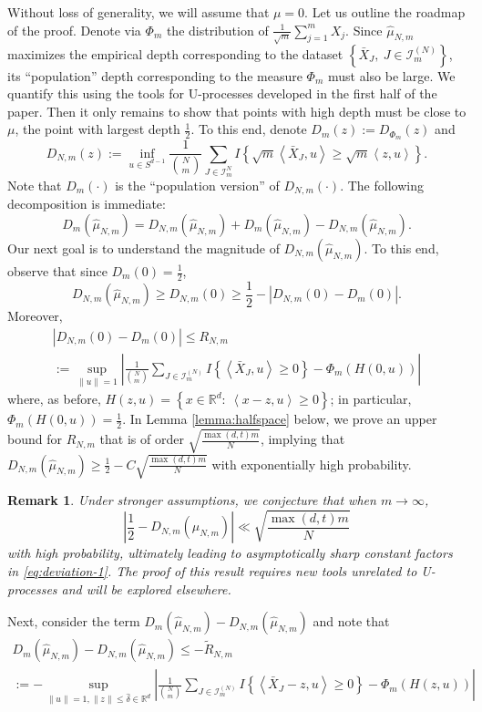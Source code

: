 \documentclass[12pt]{article}
\newcommand{\wh}{\widehat}
\newcommand{\be}[1]{\begin{equation*}#1\end{equation*}}
\def\l{\left}
\def\r{\right}
\newcommand{\m}{\mathcal}
\newcommand{\mb}{\mathbb}
\newcommand{\dotp}[2]{\left\langle#1,#2\right\rangle}
\theoremstyle{thmstyletwo}%
\newtheorem{remark}{Remark}%
\theoremstyle{thmstylethree}%
\begin{document}
Without loss of generality, we will assume that $\mu = 0$. 
Let us outline the roadmap of the proof. Denote via $\Phi_m$ the distribution of $\frac{1}{\sqrt{m}}\sum_{j=1}^m X_j$. Since $\wh\mu_{N,m}$ maximizes the empirical depth corresponding to the dataset $\l\{ \bar X_J, \ J\in \m I_{m}^{(N)}\r\}$, its ``population'' depth corresponding to the measure $\Phi_m$ must also be large. We quantify this using the tools for U-processes developed in the first half of the paper. Then it only remains to show that points with high depth must be close to $\mu$, the point with largest depth $\frac12$. To this end, denote $D_m(z):=D_{\Phi_m}(z)$ and
\[
 D_{N,m}(z):= \inf_{u\in S^{d-1}} \frac{1}{{N \choose m}} \sum_{J \in \mathcal{I}^N_m} I\left\{ \sqrt{m}\dotp{\bar X_J}{u}\geq \sqrt{m}\dotp{z}{u}\right\}.
\]
Note that $D_m(\cdot)$ is the ``population version'' of $D_{N,m}(\cdot)$. The following decomposition is immediate: 
\be{
D_m(\wh\mu_{N,m}) =  D_{N,m}(\wh\mu_{N,m}) + D_m(\wh\mu_{N,m}) -  D_{N,m}(\wh\mu_{N,m}).
}
Our next goal is to understand the magnitude of $D_{N,m}(\wh\mu_{N,m})$. To this end, observe that since $D_m(0)=\frac12$,
\[
 D_{N,m}(\wh\mu_{N,m})\geq  D_{N,m}(0) \geq \frac12 - \l| D_{N,m}(0)-D_m(0)\r|.
\]
Moreover, 
\begin{multline*}
\l| D_{N,m}(0)-D_m(0)\r| \leq R_{N,m}
\\
:= \sup_{\|u\|=1} \l| \frac{1}{{N\choose m}} \sum_{J\in \m I_{m}^{(N)} }I\left\{ \dotp{\bar X_J}{u}\geq 0\right\} - \Phi_m\l( H(0,u) \r)\r|
\end{multline*}
where, as before, $H(z,u)= \l\{ x\in\mb R^d: \ \dotp{x-z}{u}\geq 0\r\}$; in particular, $\Phi_m\l( H(0,u) \r) = \frac12$. In Lemma \ref{lemma:halfspace} below, we prove an upper bound for $R_{N,m}$ that is of order $\sqrt{\frac{\max(d,t)m}{N}}$, implying that 
$D_{N,m}(\wh\mu_{N,m}) \geq \frac12 - C\sqrt{\frac{\max(d,t)m}{N}}$ with exponentially high probability.
\begin{remark}
\label{remark:optimality}
Under stronger assumptions, we conjecture that when $m\to\infty$, 
\[
\l| \frac12 - D_{N,m}(\wh\mu_{N,m})\r|\ll \sqrt{\frac{\max(d,t)m}{N}}
\]
with high probability, ultimately leading to asymptotically sharp constant factors in \eqref{eq:deviation-1}.  The proof of this result requires new tools unrelated to U-processes and will be explored elsewhere.
\end{remark}
\noindent Next, consider the term $D_m(\wh\mu_{N,m}) -  D_{N,m}(\wh\mu_{N,m})$ and note that
\begin{multline*}
D_m(\wh\mu_{N,m}) -  D_{N,m}(\wh\mu_{N,m}) \leq -\tilde R_{N,m}
\\
:=-\sup_{\|u\|=1,\|z\|\leq \wh\delta\in \mb R^d} \l| \frac{1}{{N\choose m}} \sum_{J\in \m I_{m}^{(N)} }I\left\{ \dotp{\bar X_J-z}{u}\geq 0\right\} - \Phi_m\l( H(z,u)\r)\r|
\end{multline*}
\end{document}
